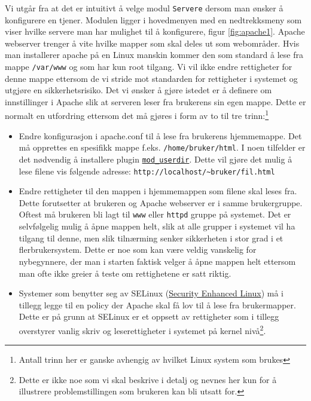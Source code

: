 Vi utgår fra at det er intuitivt å velge modul \texttt{Servere} dersom man ønsker å konfigurere en tjener. Modulen ligger i hovedmenyen med en nedtrekksmeny som viser hvilke servere man har mulighet til å konfigurere, figur \ref{fig:apache1}. 
Apache webserver trenger å vite hvilke mapper som skal deles ut som webområder. Hvis man installerer apache på en Linux manskin kommer den som standard å lese fra mappe \texttt{/var/www} og som har kun root tilgang. Vi vil ikke endre rettigheter for denne mappe ettersom de vi stride mot standarden for rettigheter i systemet og utgjøre en sikkerhetsrisiko.\cite{book:unixprog}
Det vi ønsker å gjøre istedet er å definere om innstillinger i Apache slik at serveren leser fra brukerens sin egen mappe. Dette er normalt en utfordring ettersom det må gjøres i form av to til tre trinn:\footnote{Antall trinn her er ganske avhengig av hvilket Linux system som brukes}

\begin{itemize}
\item Endre konfigurasjon i apache.conf til å lese fra brukerens hjemmemappe. Det må opprettes en spesifikk mappe f.eks. \texttt{/home/bruker/html}. 
I noen tilfelder er det nødvendig å installere plugin \href{http://httpd.apache.org/docs/2.2/mod/mod_userdir.html}{\texttt{mod\_{}userdir}}. Dette vil gjøre det mulig å lese filene vis følgende adresse: \texttt{http://localhost/\~{}bruker/fil.html}

\item Endre rettigheter til den mappen i hjemmemappen som filene skal leses fra. Dette forutsetter at brukeren og Apache webserver er i samme brukergruppe. Oftest må brukeren bli lagt til \texttt{www} eller \texttt{httpd} gruppe på systemet. Det er selvfølgelig mulig å åpne mappen helt, slik at alle grupper i systemet vil ha tilgang til denne, men slik tilnærming senker sikkerheten i stor grad i et flerbrukersystem. Dette er noe som kan være veldig vanskelig for nybegynnere, der man i starten faktisk velger å åpne mappen helt ettersom man ofte ikke greier å teste om rettighetene er satt riktig.

\item Systemer som benytter seg av SELinux (\href{http://en.wikipedia.org/wiki/Security-Enhanced_Linux}{Security Enhanced Linux}) må i tillegg legge til en policy der Apache skal få lov til å lese fra brukermapper. Dette er på grunn at SELinux er et oppsett av rettigheter som i tillegg overstyrer vanlig skriv og leserettigheter i systemet på kernel nivå\footnote{Dette er ikke noe som vi skal beskrive i detalj og nevnes her kun for å illustrere problemstillingen som brukeren kan bli utsatt for.}. 
\end{itemize}

